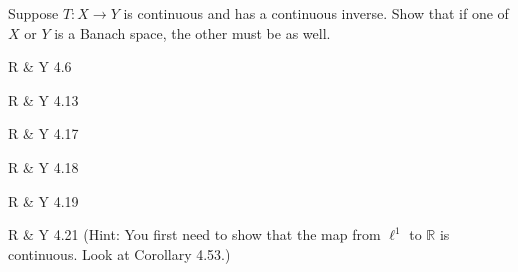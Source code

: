 \documentclass[minion]{homework}
\newcommand{\Reals}{\mathbb{R}}
\begin{document}
\begin{aproblems}

\hproblem Suppose $T:X\rightarrow Y$ is continuous and has
a continuous inverse.  Show that if one of $X$ or $Y$ is a Banach
space, the other must be as well.

\hproblem R \& Y 4.6

\hproblem R \& Y 4.13

\hproblem R \& Y 4.17

\hproblem R \& Y 4.18

\hproblem R \& Y 4.19

\hproblem R \& Y 4.21 (Hint: You first need to show that the map from $\ell^1$ to $\Reals$ is continuous.  Look at Corollary 4.53.)

\end{aproblems}
\end{document}
